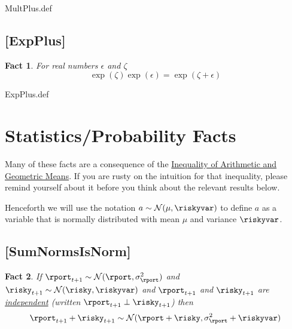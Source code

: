 \documentclass{handout}
\newtheorem{Fact}{Fact}
\begin{document}
\begin{verbatimwrite}{MultPlus.def}
\providecommand{\MultPlus}{\href{https://www.econ2.jhu.edu/people/ccarroll/public/LectureNotes/MathFacts/MathFactsList\#MultPlus}{\ensuremath{\mathtt{[MultPlus]}}}}
\end{verbatimwrite}

\hypertarget{ExpPlus}{}
\subsection{[ExpPlus]}
\begin{Fact} For real numbers $\epsilon$ and $\zeta$ 
\begin{equation}
\exp(\zeta)\exp(\epsilon) = \exp(\zeta+\epsilon)
\end{equation}
\end{Fact}

\begin{verbatimwrite}{ExpPlus.def}
\providecommand{\ExpPlus}{\href{https://www.econ2.jhu.edu/people/ccarroll/public/LectureNotes/MathFacts/MathFactsList\#ExpPlus}{\ensuremath{\mathtt{[ExpPlus]}}}}
\end{verbatimwrite}


\section{Statistics/Probability Facts}

Many of these facts are a consequence of the \href{https://en.wikipedia.org/wiki/Inequality_of_arithmetic_and_geometric_means}{Inequality of Arithmetic and Geometric Means}.  If you are rusty on the intuition for that inequality, please remind yourself about it before you think about the relevant results below.

Henceforth we will use the notation $a \sim \mathcal{N}(\mu,\riskyvar)$ to define $a$ as a variable that is normally distributed with mean $\mu$ and variance $\riskyvar$.

\hypertarget{SumNormsIsNorm}{}
\subsection{[SumNormsIsNorm]}

\begin{Fact} If $\rport_{t+1} \sim \mathcal{N}(\rport,\sigma^{2}_{\rport})$ and $\risky_{t+1} \sim \mathcal{N}(\risky,\riskyvar)$ and $\rport_{t+1}$ and $\risky_{t+1}$ are \href{http://en.wikipedia.org/wiki/Independence_(probability_theory)}{independent} (written $\rport_{t+1} \perp \risky_{t+1}$) then
\begin{equation}
        \rport_{t+1}+\risky_{t+1} \sim \mathcal{N}(\rport+\risky,\sigma^{2}_{\rport}+\riskyvar) \label{eq:SumNormsIsNorm}
\end{equation}
\end{Fact}
\end{document}
